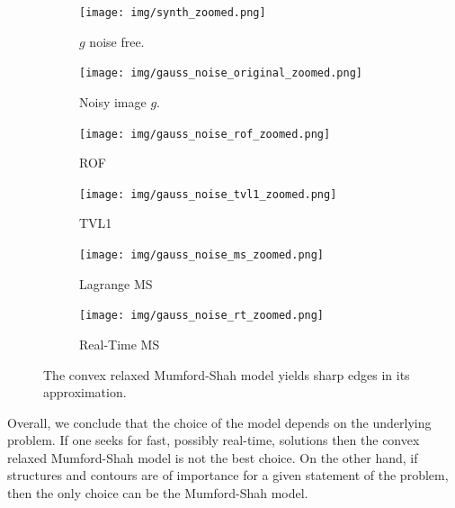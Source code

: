 \documentclass{scrreprt}
\begin{document}
            \begin{figure}[!ht]
                \centering
                \begin{subfigure}[b]{0.32\textwidth}
                    \texttt{[image: img/synth\_zoomed.png]}
                    \caption{$g$ noise free.}
                \end{subfigure}
                \begin{subfigure}[b]{0.32\textwidth}
                    \texttt{[image: img/gauss\_noise\_original\_zoomed.png]}
                    \caption{Noisy image $g$.}
                \end{subfigure}
                \begin{subfigure}[b]{0.32\textwidth}
                    \texttt{[image: img/gauss\_noise\_rof\_zoomed.png]}
                    \caption{ROF}
                \end{subfigure}
                \begin{subfigure}[b]{0.32\textwidth}
                    \texttt{[image: img/gauss\_noise\_tvl1\_zoomed.png]}
                    \caption{TVL1}
                \end{subfigure}
                \begin{subfigure}[b]{0.32\textwidth}
                    \texttt{[image: img/gauss\_noise\_ms\_zoomed.png]}
                    \caption{Lagrange MS}
                \end{subfigure}
                \begin{subfigure}[b]{0.32\textwidth}
                    \texttt{[image: img/gauss\_noise\_rt\_zoomed.png]}
                    \caption{Real-Time MS}
                \end{subfigure}
                \caption[Gauss denoising comparison of several models zooming into images.]{The convex relaxed Mumford-Shah model yields sharp edges in its approximation.}
            \label{fig:synth_gauss_compare_zoomed}
            \end{figure}

            Overall, we conclude that the choice of the model depends on the underlying problem. If one seeks for fast, possibly real-time, solutions then the convex relaxed Mumford-Shah model is not the best choice. On the other hand, if structures and contours are of importance for a given statement of the problem, then the only choice can be the Mumford-Shah model.


\end{document}
